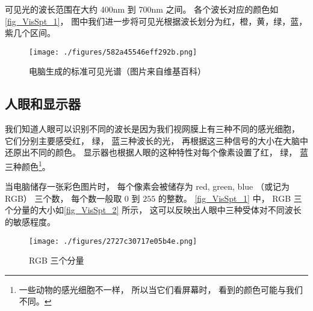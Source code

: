 
可见光的波长范围在大约 400nm 到 700nm 之间。 各个波长对应的颜色如\autoref{fig_VisSpt_1}， 图中我们进一步将可见光根据波长划分为红，橙，黄，绿，蓝，紫几个区间。

\begin{figure}[ht]
\centering
\texttt{[image: ./figures/582a45546eff292b.png]}
\caption{电脑生成的标准可见光谱（图片来自维基百科）} \label{fig_VisSpt_1}
\end{figure}

\subsection{人眼和显示器}
我们知道人眼可以识别不同的波长是因为我们视网膜上有三种不同的感光细胞， 它们分别主要感受红， 绿， 蓝三种波长的光， 再根据这三种信号的大小在大脑中还原出不同的颜色。 显示器也根据人眼的这种特性对每个像素设置了红， 绿， 蓝三种颜色\footnote{一些动物的感光细胞不一样， 所以当它们看屏幕时， 看到的颜色可能与我们不同。}。

当电脑储存一张彩色图片时， 每个像素会被储存为 red, green, blue （或记为 RGB） 三个数， 每个数一般取 $0$ 到 $255$ 的整数。 \autoref{fig_VisSpt_1} 中， RGB 三个分量的大小如\autoref{fig_VisSpt_2} 所示， 这可以反映出人眼中三种受体对不同波长的敏感程度。

\begin{figure}[ht]
\centering
\texttt{[image: ./figures/2727c30717e05b4e.png]}
\caption{RGB 三个分量} \label{fig_VisSpt_2}
\end{figure}
